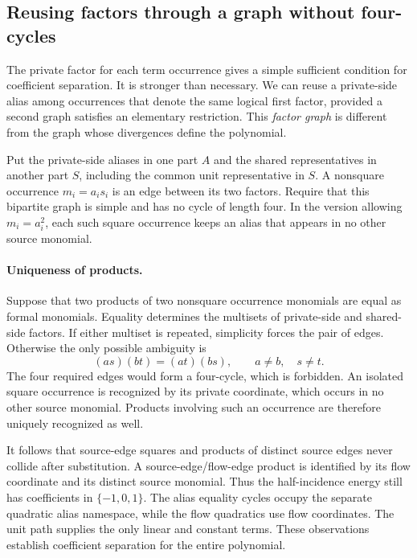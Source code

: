 \subsection{Reusing factors through a graph without four-cycles}
\label{sec:alias-compression}

The private factor for each term occurrence gives a simple sufficient
condition for coefficient separation. It is stronger than necessary.
We can reuse a private-side alias among occurrences that denote the same
logical first factor, provided a second graph satisfies an elementary
restriction. This \emph{factor graph} is different from the graph whose
divergences define the polynomial.

Put the private-side aliases in one part $A$ and the shared representatives
in another part $S$, including the common unit representative in $S$.
A nonsquare occurrence $m_i=a_is_i$ is an edge between its two factors.
Require that this bipartite graph is simple and has no cycle of length
four. In the version allowing $m_i=a_i^2$, each such square occurrence
keeps an alias that appears in no other source monomial.

\paragraph{Uniqueness of products.}
Suppose that two products of two nonsquare occurrence monomials are equal
as formal monomials. Equality determines the multisets of private-side
and shared-side factors. If either multiset is repeated, simplicity
forces the pair of edges. Otherwise the only possible ambiguity is
\[
 (as)(bt)=(at)(bs), \qquad a\ne b,\quad s\ne t.
\]
The four required edges would form a four-cycle, which is forbidden.
An isolated square occurrence is recognized by its private coordinate,
which occurs in no other source monomial. Products involving such an
occurrence are therefore uniquely recognized as well.

It follows that source-edge squares and products of distinct source
edges never collide after substitution. A source-edge/flow-edge product
is identified by its flow coordinate and its distinct source monomial.
Thus the half-incidence energy still has coefficients in
$\{-1,0,1\}$. The alias equality cycles occupy the separate quadratic
alias namespace, while the flow quadratics use flow coordinates.
The unit path supplies the only linear and constant terms. These
observations establish coefficient separation for the entire polynomial.

